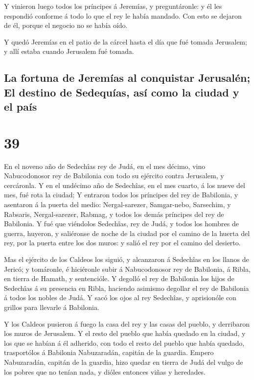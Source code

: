  Y vinieron luego todos los príncipes á Jeremías, y
preguntáronle: y él les respondió conforme á todo lo que el rey le había
mandado. Con esto se dejaron de él, porque el negocio no se había oído.

 Y quedó Jeremías en el patio de la cárcel hasta el día que
fué tomada Jerusalem; y allí estaba cuando Jerusalem fué tomada.

\hypertarget{la-fortuna-de-jeremuxedas-al-conquistar-jerusaluxe9n-el-destino-de-sedequuxedas-asuxed-como-la-ciudad-y-el-pauxeds}{%
\subsection{La fortuna de Jeremías al conquistar Jerusalén; El destino
de Sedequías, así como la ciudad y el
país}\label{la-fortuna-de-jeremuxedas-al-conquistar-jerusaluxe9n-el-destino-de-sedequuxedas-asuxed-como-la-ciudad-y-el-pauxeds}}

\hypertarget{section-38}{%
\section{39}\label{section-38}}

 En el noveno año de Sedechîas rey de Judá, en el mes
décimo, vino Nabucodonosor rey de Babilonia con todo su ejército contra
Jerusalem, y cercáronla.  Y en el undécimo año de Sedechîas,
en el mes cuarto, á los nueve del mes, fué rota la ciudad; 
Y entraron todos los príncipes del rey de Babilonia, y asentaron á la
puerta del medio: Nergal-sarezer, Samgar-nebo, Sarsechim, y Rabsaris,
Nergal-sarezer, Rabmag, y todos los demás príncipes del rey de
Babilonia.  Y fué que viéndolos Sedechîas, rey de Judá, y
todos los hombres de guerra, huyeron, y saliéronse de noche de la ciudad
por el camino de la huerta del rey, por la puerta entre los dos muros: y
salió el rey por el camino del desierto.

 Mas el ejército de los Caldeos los siguió, y alcanzaron á
Sedechîas en los llanos de Jericó; y tomáronle, é hiciéronle subir á
Nabucodonosor rey de Babilonia, á Ribla, en tierra de Hamath, y
sentencióle.  Y degolló el rey de Babilonia los hijos de
Sedechîas á su presencia en Ribla, haciendo asimismo degollar el rey de
Babilonia á todos los nobles de Judá.  Y sacó los ojos al
rey Sedechîas, y aprisionóle con grillos para llevarle á Babilonia.

 Y los Caldeos pusieron á fuego la casa del rey y las casas
del pueblo, y derribaron los muros de Jerusalem.  Y el resto
del pueblo que había quedado en la ciudad, y los que se habían á él
adherido, con todo el resto del pueblo que había quedado, trasportólos á
Babilonia Nabuzaradán, capitán de la guardia.  Empero
Nabuzaradán, capitán de la guardia, hizo quedar en tierra de Judá del
vulgo de los pobres que no tenían nada, y dióles entonces viñas y
heredades.


